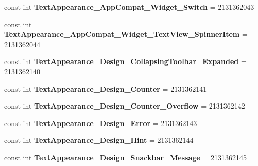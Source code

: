 \begin{DoxyCompactItemize}
const int {\bfseries Text\+Appearance\+\_\+\+App\+Compat\+\_\+\+Widget\+\_\+\+Switch} = 2131362043
\item 
\mbox{\label{class_pinned_app_1_1_droid_1_1_resource_1_1_style_a75ab8befe9ede469427000a24dcc873a}} 
const int {\bfseries Text\+Appearance\+\_\+\+App\+Compat\+\_\+\+Widget\+\_\+\+Text\+View\+\_\+\+Spinner\+Item} = 2131362044
\item 
\mbox{\label{class_pinned_app_1_1_droid_1_1_resource_1_1_style_af356306d9aed34f6b3648d3640a482b1}} 
const int {\bfseries Text\+Appearance\+\_\+\+Design\+\_\+\+Collapsing\+Toolbar\+\_\+\+Expanded} = 2131362140
\item 
\mbox{\label{class_pinned_app_1_1_droid_1_1_resource_1_1_style_a67ae86bda5664d4270aaf7e9be504f5d}} 
const int {\bfseries Text\+Appearance\+\_\+\+Design\+\_\+\+Counter} = 2131362141
\item 
\mbox{\label{class_pinned_app_1_1_droid_1_1_resource_1_1_style_a6b3f94c061e685dd3e0dbaa1da7964eb}} 
const int {\bfseries Text\+Appearance\+\_\+\+Design\+\_\+\+Counter\+\_\+\+Overflow} = 2131362142
\item 
\mbox{\label{class_pinned_app_1_1_droid_1_1_resource_1_1_style_ad71837d029db2f96ee956e038eaf7cdd}} 
const int {\bfseries Text\+Appearance\+\_\+\+Design\+\_\+\+Error} = 2131362143
\item 
\mbox{\label{class_pinned_app_1_1_droid_1_1_resource_1_1_style_ad9963d1f4c6eeb4e1d02432c806be8a3}} 
const int {\bfseries Text\+Appearance\+\_\+\+Design\+\_\+\+Hint} = 2131362144
\item 
\mbox{\label{class_pinned_app_1_1_droid_1_1_resource_1_1_style_a8d0d5aa0510fbf13f05c143e3be2f828}} 
const int {\bfseries Text\+Appearance\+\_\+\+Design\+\_\+\+Snackbar\+\_\+\+Message} = 2131362145
\item 
\mbox{\label{class_pinned_app_1_1_droid_1_1_resource_1_1_style_ae4ba7a0cb6aeeed0e82a6e9b8e3412bb}} 

\end{DoxyCompactItemize}
